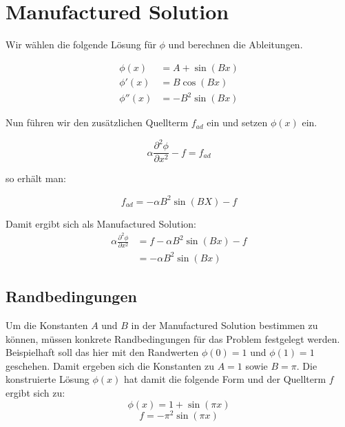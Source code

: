 \documentclass[11pt, ngerman,colorback,accentcolor=tud2d]{tudreport}
\begin{document}
\chapter{Manufactured Solution}

Wir wählen die folgende Lösung für $\phi$ und berechnen die Ableitungen.

\begin{align*}
  \phi(x) &= A + \sin(Bx)\\
  \phi'(x) &= B \cos(Bx)\\
  \phi''(x) &= -B^2\sin(Bx)
\end{align*}

Nun führen wir den zusätzlichen Quellterm $f_{ad}$ ein und setzen $\phi(x)$ ein.

\begin{equation*}
  \alpha\frac{\partial^2 \phi}{\partial x^2}-f=f_{ad}
\end{equation*}

so erhält man:

\begin{equation*}
  f_{ad} = -\alpha B^2\sin(BX)-f
\end{equation*}

Damit ergibt sich als Manufactured Solution:
\begin{align}
  \alpha\frac{\partial^2 \phi}{\partial x^2} &= f -\alpha B^2\sin(Bx)-f\\
                                             &= -\alpha B^2\sin(Bx)
\end{align}

\section{Randbedingungen}
\label{sec:Randbedingungen}

Um die Konstanten $A$ und $B$ in der Manufactured Solution bestimmen zu können,
müssen konkrete Randbedingungen für das Problem festgelegt werden. Beispielhaft
soll das hier mit den Randwerten $\phi(0) = 1$ und $\phi(1) = 1$ geschehen.
Damit ergeben sich die Konstanten zu $A = 1$ sowie $B = \pi$. Die 
konstruierte Lösung $\phi(x)$ hat damit die folgende Form und der Quellterm $f$
ergibt sich zu:
\begin{equation*}
  \phi(x) = 1 + \sin(\pi x)
\end{equation*}
\begin{equation}
  f=-\pi^2 \sin(\pi x)
  \label{eq:quellterm}
\end{equation}
\end{document}
